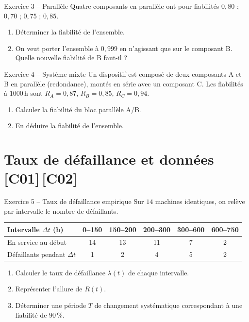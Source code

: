 \documentclass[a4paper,11pt]{article}
\begin{document}
\begin{exo}{Exercice 3 -- Parallèle}
Quatre composants en parallèle ont pour fiabilités $0{,}80$ ; $0{,}70$ ; $0{,}75$ ; $0{,}85$.
\begin{enumerate}[label=\alph*)]
  \item Déterminer la fiabilité de l'ensemble.
  \item On veut porter l'ensemble à $0{,}999$ en n'agissant que sur le composant B. Quelle nouvelle fiabilité de B faut-il ?
\end{enumerate}
\end{exo}

\begin{exo}{Exercice 4 -- Système mixte}
Un dispositif est composé de deux composants A et B en parallèle (redondance), montés en série avec un composant C. Les fiabilités à $1000$\,h sont $R_A = 0{,}87$, $R_B = 0{,}85$, $R_C = 0{,}94$.
\begin{enumerate}[label=\alph*)]
  \item Calculer la fiabilité du bloc parallèle A/B.
  \item En déduire la fiabilité de l'ensemble.
\end{enumerate}
\end{exo}

\section{Taux de défaillance et données \hfill {\normalsize\color{uimmred}[C01]\,[C02]}}

\begin{exo}{Exercice 5 -- Taux de défaillance empirique}
Sur $14$ machines identiques, on relève par intervalle le nombre de défaillants.
\begin{center}
\renewcommand{\arraystretch}{1.3}
\begin{tabular}{|l|c|c|c|c|c|}
\hline
\rowcolor{uimmlightblue}
Intervalle $\Delta t$ (h) & 0--150 & 150--200 & 200--300 & 300--600 & 600--750 \\
\hline
En service au début & 14 & 13 & 11 & 7 & 2 \\
\hline
Défaillants pendant $\Delta t$ & 1 & 2 & 4 & 5 & 2 \\
\hline
\end{tabular}
\end{center}
\begin{enumerate}[label=\alph*)]
  \item Calculer le taux de défaillance $\lambda(t)$ de chaque intervalle.
  \item Représenter l'allure de $R(t)$.
  \item Déterminer une période $T$ de changement systématique correspondant à une fiabilité de $90\,\%$.
\end{enumerate}
\end{exo}
\end{document}
